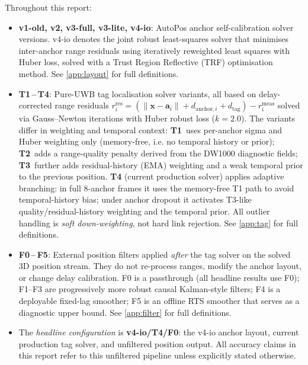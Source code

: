 \documentclass[11pt,a4paper]{article}
\begin{document}
Throughout this report:
\begin{itemize}[nosep]
  \item \textbf{v1-old, v2, v3-full, v3-lite, v4-io}: AutoPos anchor self-calibration solver versions.
        v4-io denotes the joint robust least-squares solver that minimises inter-anchor range residuals
        using iteratively reweighted least squares with Huber loss,
        solved with a Trust Region Reflective (TRF) optimisation method.
        See \cref{app:layout} for full definitions.
  \item \textbf{T1\,--\,T4}: Pure-UWB tag localisation solver variants, all based on delay-corrected range residuals
        $r_i^{\mathrm{res}} = (\lVert\mathbf{x} - \mathbf{a}_i\rVert + d_{\mathrm{anchor},i} + d_{\mathrm{tag}}) - r_i^{\mathrm{meas}}$
        solved via Gauss--Newton iterations with Huber robust loss ($k=2.0$).
        The variants differ in weighting and temporal context:
        \textbf{T1}~uses per-anchor sigma and Huber weighting only (memory-free, i.e. no temporal history or prior);
        \textbf{T2}~adds a range-quality penalty derived from the DW1000 diagnostic fields;
        \textbf{T3}~further adds residual-history (EMA) weighting and a weak temporal prior to the previous position.
        \textbf{T4} (current production solver) applies adaptive branching:
        in full 8-anchor frames it uses the memory-free T1 path to avoid temporal-history bias;
        under anchor dropout it activates T3-like quality/residual-history weighting and the temporal prior.
        All outlier handling is \emph{soft down-weighting}, not hard link rejection.
        See \cref{app:tag} for full definitions.
  \item \textbf{F0\,--\,F5}: External position filters applied \emph{after} the tag solver on the solved 3D position stream.
        They do not re-process ranges, modify the anchor layout, or change delay calibration.
        F0 is a passthrough (all headline results use F0);
        F1--F3 are progressively more robust causal Kalman-style filters;
        F4 is a deployable fixed-lag smoother;
        F5 is an offline RTS smoother that serves as a diagnostic upper bound.
        See \cref{app:filter} for full definitions.
  \item The \emph{headline configuration} is \textbf{v4-io/T4/F0}: the v4-io anchor layout, current production tag solver, and unfiltered position output.
        All accuracy claims in this report refer to this unfiltered pipeline unless explicitly stated otherwise.
\end{itemize}
\end{document}
